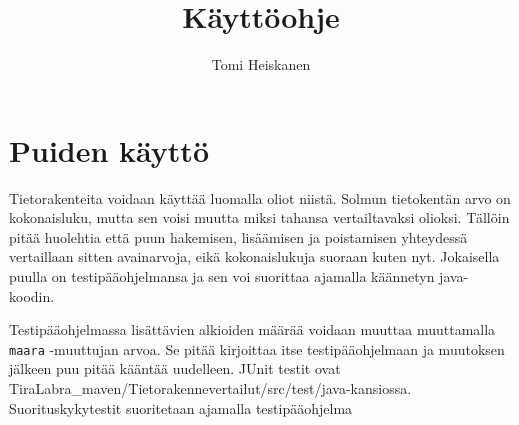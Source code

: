 \documentclass[12pt,a4paper,leqno,titlepage]{article}
\begin{document}
\title{Käyttöohje}
\author{Tomi Heiskanen}
\maketitle

\section*{Puiden käyttö}

Tietorakenteita voidaan käyttää luomalla oliot niistä. Solmun tietokentän arvo
on kokonaisluku, mutta sen voisi muutta miksi tahansa vertailtavaksi olioksi.
Tällöin pitää huolehtia että puun hakemisen, lisäämisen ja poistamisen yhteydessä
vertaillaan sitten avainarvoja, eikä kokonaislukuja suoraan kuten nyt. Jokaisella
puulla on testipääohjelmansa ja sen voi suorittaa ajamalla käännetyn java-koodin.

Testipääohjelmassa lisättävien alkioiden määrää voidaan muuttaa muuttamalla
\verb+maara+ -muuttujan arvoa. Se pitää kirjoittaa itse testipääohjelmaan ja muutoksen
jälkeen puu pitää kääntää uudelleen. JUnit testit ovat \\
TiraLabra\_maven/Tietorakennevertailut/src/test/java-kansiossa. Suorituskykytestit 
suoritetaan ajamalla testipääohjelma
\end{document}
